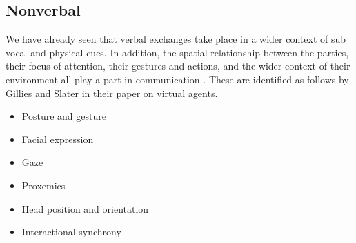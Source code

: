 \subsection{Nonverbal}
We have already seen that verbal exchanges take place in a wider context of sub vocal and physical cues. In addition, the spatial relationship between the parties, their focus of attention, their gestures and actions, and the wider context of their environment all play a part in communication \cite{Goodwin2000a}. These are identified as follows by Gillies and Slater \cite{Gillies2005} in their paper on virtual agents.\\
\begin{itemize}
\item Posture and gesture
\item Facial expression
\item Gaze
\item Proxemics
\item Head position and orientation
\item Interactional synchrony
\end{itemize}



